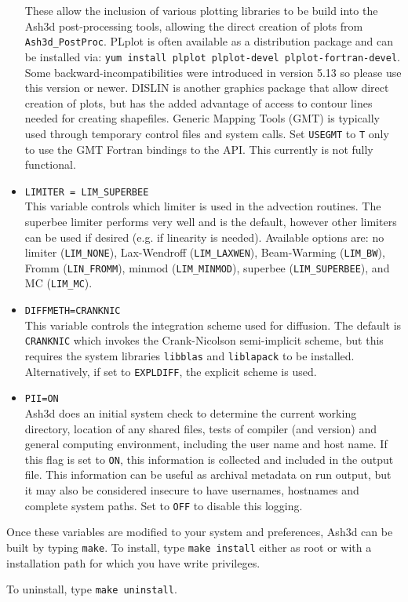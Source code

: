 \begin{itemize}
 These allow the inclusion of various plotting libraries to be build into the Ash3d
post-processing tools, allowing the direct creation of plots from \texttt{Ash3d\_PostProc}.
PLplot is often available as a distribution package and can be installed via:
\texttt{yum install plplot plplot-devel plplot-fortran-devel}. Some backward-incompatibilities
were introduced in version 5.13 so please use this version or newer. DISLIN is another
graphics package that allow direct creation of plots, but has the added advantage of
access to contour lines needed for creating shapefiles. Generic Mapping Tools (GMT)
is typically used through temporary control files and system calls.  Set \texttt{USEGMT}
to \texttt{T} only to use the GMT Fortran bindings to the API. This currently is not
fully functional.
 \item \texttt{LIMITER = LIM\_SUPERBEE}\\
This variable controls which limiter is used in the advection routines.  The
superbee limiter performs very well and is the default, however other limiters
can be used if desired (e.g. if linearity is needed).  Available options are:
no limiter (\texttt{LIM\_NONE}), Lax-Wendroff (\texttt{LIM\_LAXWEN}),
Beam-Warming (\texttt{LIM\_BW}), Fromm (\texttt{LIN\_FROMM}), 
minmod (\texttt{LIM\_MINMOD}), superbee (\texttt{LIM\_SUPERBEE}),
and MC (\texttt{LIM\_MC}).
 \item \texttt{DIFFMETH=CRANKNIC}\\
This variable controls the integration scheme used for diffusion.  The default
is \texttt{CRANKNIC} which invokes the Crank-Nicolson semi-implicit scheme, but
this requires the  system libraries \texttt{libblas} and \texttt{liblapack} to be installed.
Alternatively, if set to \texttt{EXPLDIFF}, the explicit scheme is used.
 \item \texttt{PII=ON}\\
Ash3d does an initial system check to determine the current working directory, location
of any shared files, tests of compiler (and version) and general computing
environment, including the user name and host name. If this flag is set to \texttt{ON}, this
information is collected and included in the output file.  This information
can be useful as archival metadata on run output, but it may also be considered insecure
to have usernames, hostnames and complete system paths. Set to \texttt{OFF} to
disable this logging.
\end{itemize}

Once these variables are modified to your system and preferences, Ash3d can
be built by typing \texttt{make}.  To install, type \texttt{make install}
either as root or with a installation path for which you have write
privileges.

To uninstall, type \texttt{make uninstall}.
